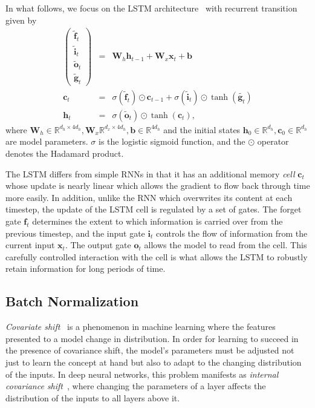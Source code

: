 \documentclass{article} %
\newcommand{\vect}[1]{\mathbf{#1}}
\newcommand{\mat}[1]{\mathbf{#1}}
\newcommand{\ewprod}{\odot}
\newcommand{\reals}{\mathbb{R}}
\begin{document}
In what follows, we focus on the LSTM architecture~\cite{lstm} with recurrent transition given by
\begin{eqnarray}
\left(\begin{array}{ccc}
\tilde{\vect{f}}_t \\
\tilde{\vect{i}}_t \\
\tilde{\vect{o}}_t \\
\tilde{\vect{g}}_t
\end{array}\right)
 &=&
 \mat{W}_h \vect{h}_{t-1} +
 \mat{W}_x \vect{x}_t +
 \vect{b}
 \\
\vect{c}_t &= &\sigma(\tilde{\vect{f}}_t) \ewprod \vect{c}_{t-1} +
\sigma(\tilde{\vect{i}}_t) \ewprod \tanh(\tilde{\vect{g}_t}) \\
\vect{h}_t &= &\sigma(\tilde{\vect{o}}_t) \ewprod \tanh(\vect{c}_t),
\end{eqnarray}
where $\vect{W}_h \in \reals^{d_h \times 4 d_h}, \vect{W}_x \reals^{d_x \times 4 d_h}, \vect{b} \in \reals^{4 d_h}$
and the initial states $\vect{h}_0 \in \reals^{d_h}, \vect{c}_0 \in \reals^{d_h}$ %
are model parameters.
$\sigma$ is the logistic sigmoid function, and the $\ewprod$ operator denotes the Hadamard product.

The LSTM differs from simple RNNs in that it has an additional memory \emph{cell} 
$\vect{c}_t$ whose update is nearly linear which allows the gradient to flow back 
through time more easily. In addition, unlike the RNN which overwrites its content 
at each timestep, the update of the LSTM cell is regulated by a set of gates.
The forget gate $\vect{f}_t$ determines the extent to which information is carried over from the previous timestep,
and the input gate $\vect{i}_t$ controls the flow of information from the current input $\vect{x}_t$.
The output gate $\vect{o}_t$ allows the model to read from the cell. This carefully 
controlled interaction with the cell is what allows the LSTM to robustly retain 
information for long periods of time.

\subsection{Batch Normalization}

\emph{Covariate shift}~\cite{shimodaira2000improving} is a phenomenon in machine learning where
the features presented to a model change in distribution.
In order for learning to succeed in the presence of covariance shift,
the model's parameters must be adjusted not just to learn the concept at hand
but also to adapt to the changing distribution of the inputs.
In deep neural networks, this problem manifests as \emph{internal covariance shift}~\cite{batchnorm},
where changing the parameters of a layer affects the distribution of the inputs to all layers above it.
\end{document}
